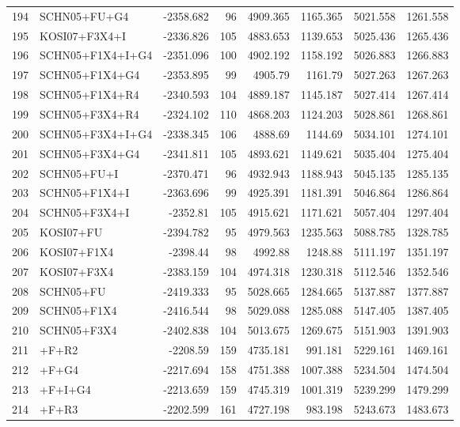 \begin{longtable}{clrrrrrr}
	194 & SCHN05+FU+G4 & -2358.682 & 96 & 4909.365 & 1165.365 & 5021.558 & 1261.558 \\ 
	195 & KOSI07+F3X4+I & -2336.826 & 105 & 4883.653 & 1139.653 & 5025.436 & 1265.436 \\ 
	196 & SCHN05+F1X4+I+G4 & -2351.096 & 100 & 4902.192 & 1158.192 & 5026.883 & 1266.883 \\ 
	197 & SCHN05+F1X4+G4 & -2353.895 & 99 & 4905.79 & 1161.79 & 5027.263 & 1267.263 \\ 
	198 & SCHN05+F1X4+R4 & -2340.593 & 104 & 4889.187 & 1145.187 & 5027.414 & 1267.414 \\ 
	199 & SCHN05+F3X4+R4 & -2324.102 & 110 & 4868.203 & 1124.203 & 5028.861 & 1268.861 \\ 
	200 & SCHN05+F3X4+I+G4 & -2338.345 & 106 & 4888.69 & 1144.69 & 5034.101 & 1274.101 \\ 
	201 & SCHN05+F3X4+G4 & -2341.811 & 105 & 4893.621 & 1149.621 & 5035.404 & 1275.404 \\ 
	202 & SCHN05+FU+I & -2370.471 & 96 & 4932.943 & 1188.943 & 5045.135 & 1285.135 \\ 
	203 & SCHN05+F1X4+I & -2363.696 & 99 & 4925.391 & 1181.391 & 5046.864 & 1286.864 \\ 
	204 & SCHN05+F3X4+I & -2352.81 & 105 & 4915.621 & 1171.621 & 5057.404 & 1297.404 \\ 
	205 & KOSI07+FU & -2394.782 & 95 & 4979.563 & 1235.563 & 5088.785 & 1328.785 \\ 
	206 & KOSI07+F1X4 & -2398.44 & 98 & 4992.88 & 1248.88 & 5111.197 & 1351.197 \\ 
	207 & KOSI07+F3X4 & -2383.159 & 104 & 4974.318 & 1230.318 & 5112.546 & 1352.546 \\ 
	208 & SCHN05+FU & -2419.333 & 95 & 5028.665 & 1284.665 & 5137.887 & 1377.887 \\ 
	209 & SCHN05+F1X4 & -2416.544 & 98 & 5029.088 & 1285.088 & 5147.405 & 1387.405 \\ 
	210 & SCHN05+F3X4 & -2402.838 & 104 & 5013.675 & 1269.675 & 5151.903 & 1391.903 \\ 
	211 & \gy+F+R2 & -2208.59 & 159 & 4735.181 & 991.181 & 5229.161 & 1469.161 \\ 
	212 & \gy+F+G4 & -2217.694 & 158 & 4751.388 & 1007.388 & 5234.504 & 1474.504 \\ 
	213 & \gy+F+I+G4 & -2213.659 & 159 & 4745.319 & 1001.319 & 5239.299 & 1479.299 \\ 
	214 & \gy+F+R3 & -2202.599 & 161 & 4727.198 & 983.198 & 5243.673 & 1483.673 \\ 

\end{longtable}
